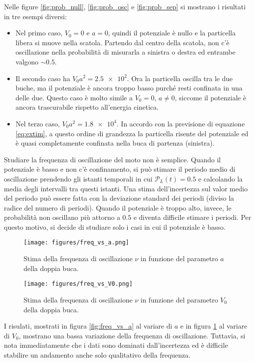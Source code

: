 \documentclass[a4paper, titlepage]{article}
\numberwithin{equation}{section}
\begin{document}
Nelle figure \ref{fig:prob_null}, \ref{fig:prob_osc} e \ref{fig:prob_sep} si mostrano i risultati in tre esempi diversi:
\begin{itemize}
    \item Nel primo caso, $V_0 = 0$ e $a = 0$, quindi il potenziale è nullo e la particella libera si muove nella scatola. Partendo dal centro della scatola, non c'è oscillazione nella probabilità di misurarla a sinistra o destra ed entrambe valgono $\sim 0.5$.
    \item Il secondo caso ha $V_0 a^2 = \num{2.5e2}$. Ora la particella oscilla tra le due buche, ma il potenziale è ancora troppo basso purché resti confinata in una delle due. Questo caso è molto simile a $V_0 = 0$, $a \neq 0$, siccome il potenziale è ancora trascurabile rispetto all'energia cinetica.
    \item Nel terzo caso, $V_0 a^2 = \num{1.8e4}$. In accordo con la previsione di equazione \eqref{eq:extim}, a questo ordine di grandezza la particella risente del potenziale ed è quasi completamente confinata nella buca di partenza (sinistra).
\end{itemize}
Studiare la frequenza di oscillazione del moto non è semplice. Quando il potenziale è basso e non c'è confinamento, si può stimare il periodo medio di oscillazione prendendo gli istanti temporali in cui $\mathcal{P}_L(t) = 0.5$ e calcolando la media degli intervalli tra questi istanti. Una stima dell'incertezza sul valor medio del periodo può essere fatta con la deviazione standard dei periodi (diviso la radice del numero di periodi). Quando il potenziale è troppo alto, invece, le probabilità non oscillano più attorno a $0.5$ e diventa difficile stimare i periodi. Per questo motivo, si decide di studiare solo i casi in cui il potenziale è basso.
\begin{figure}[h!]
    \centering
    \begin{minipage}[t]{0.47 \textwidth}
        \centering
        \texttt{[image: figures/freq\_vs\_a.png]}
        \caption{Stima della frequenza di oscillazione $\nu$ in funzione del parametro $a$ della doppia buca.}
        \label{fig:freq_vs_a}
    \end{minipage}
    \hspace{0.02\textwidth}
    \begin{minipage}[t]{0.47 \textwidth}
        \centering
        \texttt{[image: figures/freq\_vs\_V0.png]}
        \caption{Stima della frequenza di oscillazione $\nu$ in funzione del parametro $V_0$ della doppia buca.}
        \label{fig:freq_vs_V0}
    \end{minipage}
\end{figure}
I risulati, mostrati in figura \ref{fig:freq_vs_a} al variare di $a$ e in figura \ref{fig:freq_vs_V0} al variare di $V_0$, mostrano una bassa variazione della frequenza di oscillazione. Tuttavia, si nota immediatamente che i dati sono dominati dall'incertezza ed è difficile stabilire un andamento anche solo qualitativo della frequenza.
\end{document}

